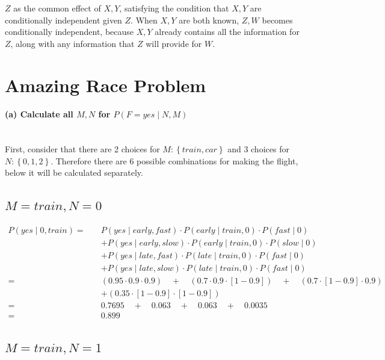 \documentclass[12pt,letterpaper]{article}
\begin{document}
$Z$ as the common effect of $X, Y$, satisfying the condition that $X, Y$ are conditionally independent given $Z$. When $X, Y$ are both known, $Z, W$ becomes conditionally independent, because $X, Y$ already contains all the information for $Z$, along with any information that $Z$ will provide for $W$.

\section*{Amazing Race Problem}

\paragraph{(a) Calculate all $M, N$ for $P(F = yes \mid N, M)$}  \mbox{}\\

First, consider that there are 2 choices for $M: \left\{ train, car \right\}$ and 3 choices for $N : \left\{ 0, 1, 2 \right\}$. Therefore there are 6 possible combinations for making the flight, below it will be calculated separately.

\subsection{$M = train, N = 0$}

\begin{align*}
    P(yes \mid 0, train) = \quad &P(yes \mid early, fast) \cdot P(early \mid train, 0) \cdot P(fast \mid 0) \\
                                &+ P(yes \mid early, slow) \cdot P(early \mid train, 0) \cdot P(slow \mid 0) \\
                                &+ P(yes \mid late, fast) \cdot P(late \mid train, 0) \cdot P(fast \mid 0) \\
                                &+ P(yes \mid late, slow) \cdot P(late \mid train, 0) \cdot P(fast \mid 0) \\
    = \quad &(0.95 \cdot 0.9 \cdot 0.9) \quad + \quad (0.7 \cdot 0.9 \cdot [1-0.9]) \quad + \quad (0.7 \cdot [1-0.9] \cdot 0.9) \\
            &+ (0.35 \cdot [1-0.9] \cdot [1-0.9]) \\
    = \quad &0.7695 \quad + \quad 0.063 \quad + \quad 0.063 \quad + \quad 0.0035 \\
    = \quad &0.899
\end{align*}

\subsection{$M = train, N = 1$}
\end{document}
